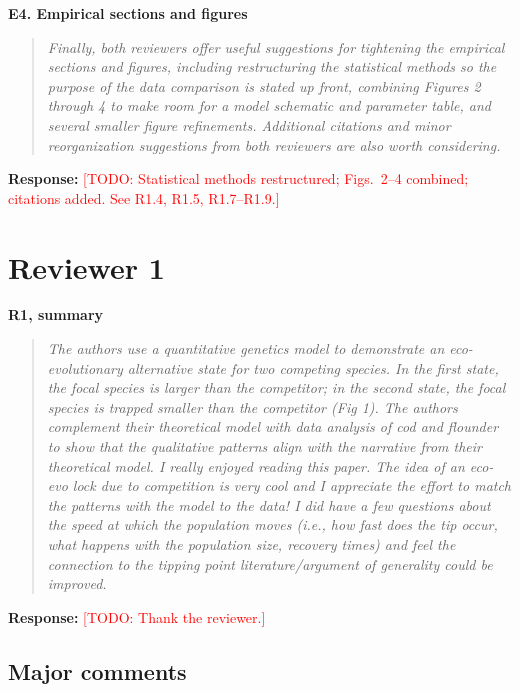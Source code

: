\documentclass[11pt]{article}
\newenvironment{revcomment}[1]
  {\par\medskip\noindent\textbf{#1}\par\begin{quote}\itshape\color{commentgrey}}
  {\end{quote}}
\newcommand{\response}{\par\noindent\textbf{Response:} }
\newcommand{\todo}[1]{\textcolor{red}{[TODO: #1]}}
\begin{document}
\begin{revcomment}{E4. Empirical sections and figures}
Finally, both reviewers offer useful suggestions for tightening the empirical sections and figures, including restructuring the statistical methods so the purpose of the data comparison is stated up front, combining Figures 2 through 4 to make room for a model schematic and parameter table, and several smaller figure refinements. Additional citations and minor reorganization suggestions from both reviewers are also worth considering.
\end{revcomment}

\response \todo{Statistical methods restructured; Figs.~2--4 combined; citations added. See R1.4, R1.5, R1.7--R1.9.}

\section*{Reviewer 1}

\begin{revcomment}{R1, summary}
The authors use a quantitative genetics model to demonstrate an eco-evolutionary alternative state for two competing species. In the first state, the focal species is larger than the competitor; in the second state, the focal species is trapped smaller than the competitor (Fig 1). The authors complement their theoretical model with data analysis of cod and flounder to show that the qualitative patterns align with the narrative from their theoretical model. I really enjoyed reading this paper. The idea of an eco-evo lock due to competition is very cool and I appreciate the effort to match the patterns with the model to the data! I did have a few questions about the speed at which the population moves (i.e., how fast does the tip occur, what happens with the population size, recovery times) and feel the connection to the tipping point literature/argument of generality could be improved.
\end{revcomment}

\response \todo{Thank the reviewer.}

\subsection*{Major comments}
\end{document}
